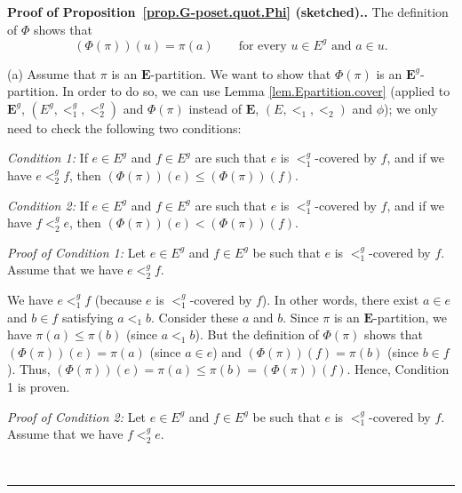 \documentclass[numbers=enddot,12pt,final,onecolumn,notitlepage,abstracton]{scrartcl}
\theoremstyle{definition}
\newenvironment{proof}[1][Proof]{\noindent\textbf{#1.} }{\ \rule{0.5em}{0.5em}}
\newcommand{\EE}{{\mathbf{E}}}
\begin{document}
\begin{proof}[Proof of Proposition~\ref{prop.G-poset.quot.Phi} (sketched).]
The definition of $\Phi$ shows that
\begin{equation}
\left(\Phi\left(\pi\right)\right) \left( u \right)
= \pi\left( a \right)
\qquad\text{for every } u \in E^{g} \text{ and } a \in u.
\label{pf.prop.G-poset.quot.phi.main}
\end{equation}

(a) Assume that $\pi$ is an $\EE$-partition. We
want to show that $\Phi\left(  \pi\right)  $ is an
$ \EE ^{g}$-partition. In order to do so, we can
use Lemma \ref{lem.Epartition.cover}
(applied to $\EE^{g}$, $\left(  E^{g},<_{1}^{g},<_{2}^{g}\right)  $ and
$\Phi\left(  \pi\right)  $ instead of $\EE$,
$\left(  E,<_{1},<_{2}\right)  $ and $\phi$); we only need to
check the following two conditions:

\textit{Condition 1:} If $e\in E^{g}$ and $f\in E^{g}$ are such that $e$ is
$<_{1}^{g}$-covered by $f$, and if we have $e<_{2}^{g}f$, then $\left(
\Phi\left(  \pi\right)  \right)  \left(  e\right)  \leq\left(  \Phi\left(
\pi\right)  \right)  \left(  f\right)  $.

\textit{Condition 2:} If $e\in E^{g}$ and $f\in E^{g}$ are such that $e$ is
$<_{1}^{g}$-covered by $f$, and if we have $f<_{2}^{g}e$, then $\left(
\Phi\left(  \pi\right)  \right)  \left(  e\right)  <\left(  \Phi\left(
\pi\right)  \right)  \left(  f\right)  $.

\textit{Proof of Condition 1:} Let $e\in E^{g}$ and $f\in E^{g}$ be such that
$e$ is $<_{1}^{g}$-covered by $f$. Assume that we have $e<_{2}^{g}f$.

We have $e<_{1}^{g}f$ (because $e$ is $<_{1}^{g}$-covered by $f$). In other
words, there exist $a\in e$ and $b\in f$ satisfying $a<_{1}b$. Consider these
$a$ and $b$. Since $\pi$ is an $\EE$-partition, we have $\pi\left(
a\right)  \leq\pi\left(  b\right)  $ (since $a<_{1}b$). But the definition of
$\Phi\left(  \pi\right)  $ shows that $\left(  \Phi\left(  \pi\right)
\right)  \left(  e\right)  =\pi\left(  a\right)  $ (since $a\in e$) and
$\left(  \Phi\left(  \pi\right)  \right)  \left(  f\right)  =\pi\left(
b\right)  $ (since $b\in f$). Thus, $\left(  \Phi\left(  \pi\right)  \right)
\left(  e\right)  =\pi\left(  a\right)  \leq\pi\left(  b\right)  =\left(
\Phi\left(  \pi\right)  \right)  \left(  f\right)  $. Hence, Condition 1 is proven.

\textit{Proof of Condition 2:} Let $e\in E^{g}$ and $f\in E^{g}$ be such that
$e$ is $<_{1}^{g}$-covered by $f$. Assume that we have $f<_{2}^{g}e$.


\end{proof}
\end{document}
